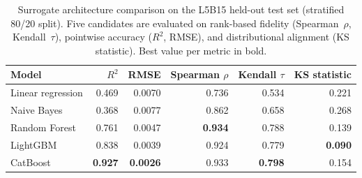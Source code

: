 \begin{table}[ht]
\caption{Surrogate architecture comparison on the L5B15 held-out test set (stratified 80/20 split). Five candidates are evaluated on rank-based fidelity (Spearman~$\rho$, Kendall~$\tau$), pointwise accuracy ($R^2$, RMSE), and distributional alignment (KS statistic). Best value per metric in bold.}
\label{tab:surrogate_comparison}
\centering
\begin{tabular}{lrrrrr}
\toprule
Model & $R^2$ & RMSE & Spearman $\rho$ & Kendall $\tau$ & KS statistic \\
\midrule
Linear regression & 0.469 & 0.0070 & 0.736 & 0.534 & 0.221 \\
Naive Bayes & 0.368 & 0.0077 & 0.862 & 0.658 & 0.268 \\
Random Forest & 0.761 & 0.0047 & \textbf{0.934} & 0.788 & 0.139 \\
LightGBM & 0.838 & 0.0039 & 0.924 & 0.779 & \textbf{0.090} \\
CatBoost & \textbf{0.927} & \textbf{0.0026} & 0.933 & \textbf{0.798} & 0.154 \\
\bottomrule
\end{tabular}
\end{table}
